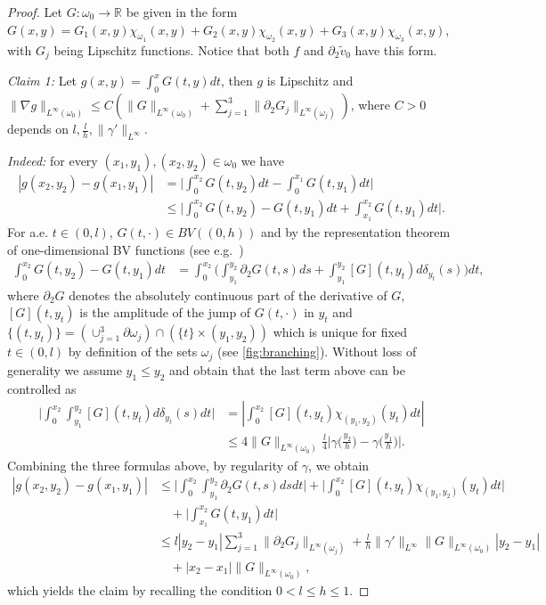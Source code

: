 \documentclass[a4paper, 10pt, twoside, notitlepage]{amsart}
\theoremstyle{plain}
\newcommand{\R}{\mathbb{R}}
\newcommand{\p}{\partial}
\begin{document}
\begin{proof}
Let $G:\omega_0\to\R$ be given in the form $G(x,y) = G_1(x,y) \chi_{\omega_1}(x,y) + G_2(x,y) \chi_{\omega_2} (x,y) + G_3(x,y) \chi_{\omega_3}(x,y)$, with $G_j$ being Lipschitz functions.
Notice that both $f$ and $\p_2\tilde v_0$ have this form.

\smallskip

\emph{Claim 1:}
Let $g(x,y)=\int_0^x G(t,y)dt$, then $g$ is Lipschitz and $\|\nabla g\|_{L^\infty(\omega_0)}\le C(\|G\|_{L^\infty(\omega_0)}+\sum_{j=1}^3\|\p_2 G_j\|_{L^\infty(\omega_j)})$, where $C>0$ depends on $l, \frac{l}{h}, \|\gamma'\|_{L^{\infty}}$.

\smallskip

\emph{Indeed:} for every $(x_1,y_1),(x_2,y_2)\in\omega_0$ we have
\begin{align*}
|g(x_2,y_2)-g(x_1,y_1)| &= \Big|\int_0^{x_2}G(t,y_2)dt-\int_0^{x_1}G(t,y_1)dt\Big| \\
&\le \Big|\int_0^{x_2}G(t,y_2)-G(t,y_1)dt+\int_{x_1}^{x_2}G(t,y_1)dt\Big|.
\end{align*}
For a.e. $t\in(0,l)$, $G(t,\cdot)\in BV((0,h))$ and by the representation theorem of one-dimensional BV functions (see e.g.\ \cite[Theorem 3.28 and Corollary 3.33]{AFP2000})
\begin{align*}
\int_0^{x_2}G(t,y_2)-G(t,y_1)dt &= \int_0^{x_2}\Big(\int_{y_1}^{y_2}\p_2 G(t,s)ds+\int_{y_1}^{y_2}[G](t,y_t) d\delta_{y_t}(s)\Big) dt,
\end{align*}
where $\p_2 G$ denotes the absolutely continuous part of the derivative of $G$, $[G](t,y_t)$ is the amplitude of the jump of $G(t,\cdot)$ in $y_t$ and $\{(t,y_t)\}=(\cup_{j=1}^3\p\omega_j)\cap(\{t\}\times(y_1,y_2))$ which is unique for fixed $t \in (0,l)$ by definition of the sets $\omega_j$ (see \cref{fig:branching}).
Without loss of generality we assume $y_1 \leq y_2$ and obtain that the last term above can be controlled as 
\begin{align*}
  \Big|\int_0^{x_2} \int_{y_1}^{y_2}[G](t,y_t) d\delta_{y_t}(s) dt\Big| &= \left| \int_0^{x_2} [G](t,y_t) \chi_{(y_1,y_2)}(y_t) dt \right| \\
  &\le 4\|G\|_{L^\infty(\omega_0)}\frac{l}{4}\Big|\gamma\Big(\frac{y_2}{h}\Big)-\gamma\Big(\frac{y_1}{h}\Big)\Big|.
\end{align*}
Combining the three formulas above, by regularity of $\gamma$, we obtain
\begin{align*}
|g(x_2,y_2)-g(x_1,y_1)| &\le \Big|\int_0^{x_2}\int_{y_1}^{y_2}\p_2 G(t,s)dsdt\Big|+ \Big| \int_0^{x_2} [G](t,y_t) \chi_{(y_1,y_2)}(y_t) dt\Big| \\
&\quad +\Big|\int_{x_1}^{x_2}G(t,y_1)dt\Big| \\
&\le l|y_2-y_1| \sum_{j=1}^3\|\p_2 G_j\|_{L^{\infty}(\omega_j)}+ \frac{l}{h}\|\gamma'\|_{L^\infty}\|G\|_{L^{\infty}(\omega_0)}|y_2-y_1| \\
&\quad +|x_2-x_1|\|G\|_{L^\infty(\omega_0)},
\end{align*}
which yields the claim by recalling the condition $0<l\le h\le1$.


\end{proof}
\end{document}

